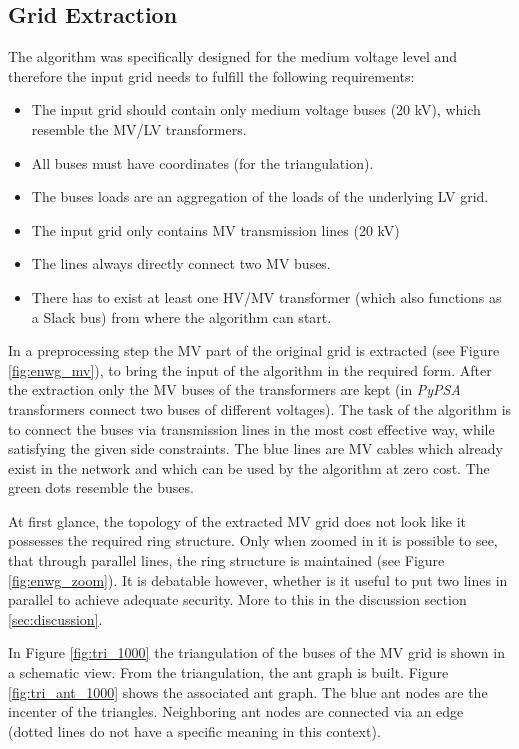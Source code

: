 \subsection{Grid Extraction}\label{sec:extraction}
The algorithm was specifically designed for the medium voltage level and therefore the input grid needs to fulfill the following requirements:
\begin{itemize}
	\setlength\itemsep{-1em}
	\item The input grid should contain only medium voltage buses (20 kV), which resemble the MV/LV transformers.
	\item All buses must have coordinates (for the triangulation).
	\item The buses loads are an aggregation of the loads of the underlying LV grid.
	\item The input grid only contains MV transmission lines (20 kV)
	\item The lines always directly connect two MV buses. 
	\item There has to exist at least one HV/MV transformer (which also functions as a Slack bus) from where the algorithm can start.
\end{itemize}



In a preprocessing step the MV part of the original grid is extracted (see Figure \ref{fig:enwg_mv}), to bring the input of the algorithm in the required form. After the extraction only the MV buses of the transformers are kept (in \textit{PyPSA} transformers connect two buses of different voltages). The task of the algorithm is to connect the buses via transmission lines in the most cost effective way, while satisfying the given side constraints. The blue lines are MV cables which already exist in the network and which can be used by the algorithm at zero cost. The green dots resemble the buses.




At first glance, the topology of the extracted MV grid does not look like it possesses the required ring structure. Only when zoomed in it is possible to see, that through parallel lines, the ring structure is maintained (see Figure \ref{fig:enwg_zoom}). It is debatable however, whether is it useful to put two lines in parallel to achieve adequate security. More to this in the discussion section \ref{sec:discussion}.
%


In Figure \ref{fig:tri_1000} the triangulation of the buses of the MV grid is shown in a schematic view. From the triangulation, the ant graph is built. Figure \ref{fig:tri_ant_1000} shows the associated ant graph. The blue ant nodes are the incenter of the triangles. Neighboring ant nodes are connected via an edge (dotted lines do not have a specific meaning in this context).

